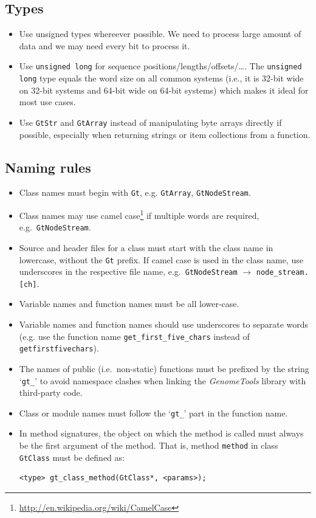\documentclass[11pt,final]{article}
\newcommand{\keyword}[1]{\lstinline{#1}}
\newcommand{\Gt}[0]{\emph{GenomeTools}\xspace}
\begin{document}
\subsection{Types}
\begin{itemize}
\item
Use unsigned types whereever possible. We need to process large amount
of data and we may need every bit to process it.
\item
Use \keyword{unsigned long} for sequence positions/lengths/offsets/\dots .
The \keyword{unsigned long} type equals the word size on all common systems
(i.e., it is 32-bit wide on 32-bit systems and 64-bit wide on 64-bit systems)
which makes it ideal for most use cases.
\item
Use \keyword{GtStr} and \keyword{GtArray} instead of manipulating byte arrays
directly if possible, especially when returning strings or item collections
from a function.
\end{itemize}

\subsection{Naming rules}
\begin{itemize}
\item
Class names must begin with \keyword{Gt}, e.g. \keyword{GtArray},
\keyword{GtNodeStream}.
\item
Class names may use camel
case\footnote{\url{http://en.wikipedia.org/wiki/CamelCase}} if multiple words
are required, e.g.\ \keyword{GtNodeStream}.
\item
Source and header files for a class must start with the class name in
lowercase, without the \keyword{Gt} prefix. If camel case is used in the class
name, use underscores in the respective file name, e.g.\
\keyword{GtNodeStream} $\to$ \keyword{node_stream.[ch]}.
\item
Variable names and function names must be all lower-case.
\item
Variable names and function names should use underscores to separate words
(e.g. use the function name \keyword{get_first_five_chars} instead of
\keyword{getfirstfivechars}).
\item
The names of public (i.e.\ non-static) functions must be prefixed by the string
`\keyword{gt_}' to avoid namespace clashes when linking the \Gt library with
third-party code.
\item
Class or module names must follow the `\keyword{gt_}' part in the function name.
\item
In method signatures, the object on which the method is called must always be
the first argument of the method.
That is, method \keyword{method} in class \keyword{GtClass} must be defined as:
\begin{lstlisting}
<type> gt_class_method(GtClass*, <params>);
\end{lstlisting}
\end{itemize}
\end{document}
